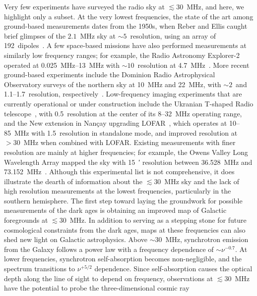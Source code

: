 \documentclass{ws-jai}
\begin{document}
Very few experiments have surveyed the radio sky at $\lesssim 30$~MHz,
and here, we highlight only a subset.  At the very lowest frequencies,
the state of the art among ground-based measurements dates from the
1950s, when Reber and Ellis caught brief glimpses of the $2.1$~MHz sky
at $\sim 5$\degree\ resolution, using an array of
192~dipoles~\citep{1956JGR....61....1R}.  A few space-based missions
have also performed measurements at similarly low frequency ranges;
for example, the Radio Astronomy Explorer-2 operated at
\SIrange{0.025}{13}{\MHz} with $\sim 10$\degree\ resolution at
\SI{4.7}{\MHz}~\citep{1975A&A....40..365A}.  More recent ground-based
experiments include the Dominion Radio Astrophysical Observatory
surveys of the northern sky at 10~MHz and 22~MHz, with
$\sim2$\degree\ and 1.1--1.7\degree\ resolution,
respectively~\citep{1976MNRAS.177..601C, 1999A&AS..137....7R}.
Low-frequency imaging experiments that are currently operational or
under construction include the Ukranian T-shaped Radio
telescope~\citep{2016JAI.....541010Z}, with 0.5\degree\ resolution at
the center of its 8--32~MHz operating range, and the New extension in
Nan\c{c}ay upgrading LOFAR~\citep{7136773}, which operates at
10--85~MHz with 1.5\degree\ resolution in standalone mode, and
improved resolution at $>30$~MHz when combined with LOFAR.  Existing
measurements with finer resolution are mainly at higher frequencies;
for example, the Owens Valley Long Wavelength Array mapped the sky
with \SI{15}{\arcminute} resolution between 36.528~MHz and
73.152~MHz~\citep{2018AJ....156...32E}.  Although this experimental
list is not comprehensive, it does illustrate the dearth of
information about the $\lesssim 30$~MHz sky and the lack of high
resolution measurements at the lowest frequencies, particularly in the
southern hemisphere.  The first step toward laying the groundwork for
possible measurements of the dark ages is obtaining an improved map of
Galactic foregrounds at $\lesssim 30$~MHz.  In addition to serving as
a stepping stone for future cosmological constraints from the dark
ages, maps at these frequencies can also shed new light on Galactic
astrophysics.  Above $\sim30$~MHz, synchrotron emission from the
Galaxy follows a power law with a frequency dependence of $\sim
\nu^{-0.7}$.  At lower frequencies, synchrotron self-absorption
becomes non-negligible, and the spectrum transitions to $\nu^{+5/2}$
dependence.  Since self-absorption causes the optical depth along the
line of sight to depend on frequency, observations at $\lesssim
30$~MHz have the potential to probe the three-dimensional cosmic ray
\end{document}
